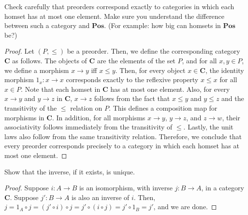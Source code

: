 \documentclass[]{amsbook}
\newcommand{\catname}[1]{\mathbf{#1}}
\begin{document}
\begin{Exercise}
    Check carefully that preorders correspond exactly to categories in which
    each homset has at most one element. Make sure you understand the
    difference between such a category and $\catname{Pos}$. (For example: how
    big can homsets in $\catname{Pos}$ be?)
\end{Exercise}
\begin{proof}
	Let $(P, \le)$ be a preorder. Then, we define the corresponding category
	$\catname{C}$ as follows. The objects of $\catname{C}$ are the elements of
	the set $P$, and for all $x, y \in P$, we define a morphism $x \to y$ iff
	$x \le y$. Then, for every object $x \in \catname{C}$, the identity
	morphism $1_x: x \to x$ corresponds exactly to the reflexive property
	$x \le x$ for all $x \in P$. Note that each homset in $\catname{C}$ has at
	most one element. Also, for every $x \to y$ and $y \to z$ in $\catname{C}$,
	$x \to z$ follows from the fact that $x \le y$ and $y \le z$ and the
	transitivity of the $\le$ relation on $P$. This defines a composition map
	for morphisms in $\catname{C}$. In addition, for all morphisms $x \to y$,
	$y \to z$, and $z \to w$, their associativity follows immediately from the
	transitivity of $\le$. Lastly, the unit laws also follow from the same
	transitivity relation. Therefore, we conclude that every preorder
	corresponds precisely to a category in which each homset has at most one
	element.
\end{proof}

\setcounter{Exercise}{9}
\begin{Exercise}
	Show that the inverse, if it exists, is unique.
\end{Exercise}
\begin{proof}
	Suppose $i: A \to B$ is an isomorphism, with inverse $j: B \to A$, in a
	category $\catname{C}$. Suppose $j': B \to A$ is also an inverse of $i$.
	Then, $j = 1_A \circ j = (j' \circ i) \circ j = j' \circ (i \circ j) =
	j' \circ 1_B = j'$, and we are done.
\end{proof}
\end{document}

